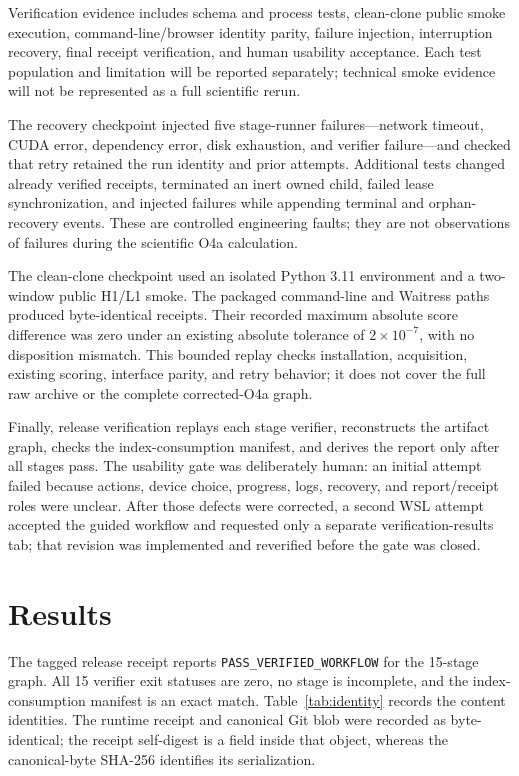 \documentclass[aps,prd,twocolumn,superscriptaddress,nofootinbib,amsmath,amssymb,floatfix,10pt]{revtex4-2}
\begin{document}
Verification evidence includes schema and process tests, clean-clone public
smoke execution, command-line/browser identity parity, failure injection,
interruption recovery, final receipt verification, and human usability
acceptance.  Each test population and limitation will be reported separately;
technical smoke evidence will not be represented as a full scientific rerun.

The recovery checkpoint injected five stage-runner failures---network timeout,
CUDA error, dependency error, disk exhaustion, and verifier failure---and
checked that retry retained the run identity and prior attempts.  Additional
tests changed already verified receipts, terminated an inert owned child,
failed lease synchronization, and injected failures while appending terminal
and orphan-recovery events.  These are controlled engineering faults; they are
not observations of failures during the scientific O4a calculation.

The clean-clone checkpoint used an isolated Python 3.11 environment and a
two-window public H1/L1 smoke.  The packaged command-line and Waitress paths
produced byte-identical receipts.  Their recorded maximum absolute score
difference was zero under an existing absolute tolerance of $2\times10^{-7}$,
with no disposition mismatch.  This bounded replay checks installation,
acquisition, existing scoring, interface parity, and retry behavior; it does
not cover the full raw archive or the complete corrected-O4a graph.

Finally, release verification replays each stage verifier, reconstructs the
artifact graph, checks the index-consumption manifest, and derives the report
only after all stages pass.  The usability gate was deliberately human: an
initial attempt failed because actions, device choice, progress, logs, recovery,
and report/receipt roles were unclear.  After those defects were corrected, a
second WSL attempt accepted the guided workflow and requested only a separate
verification-results tab; that revision was implemented and reverified before
the gate was closed.

\section{Results}
\label{sec:results}

The tagged release receipt reports \texttt{PASS\_VERIFIED\_WORKFLOW} for the
15-stage graph.  All 15 verifier exit statuses are zero, no stage is incomplete,
and the index-consumption manifest is an exact match.  Table~\ref{tab:identity}
records the content identities.  The runtime receipt and canonical Git blob
were recorded as byte-identical; the receipt self-digest is a field inside that
object, whereas the canonical-byte SHA-256 identifies its serialization.
\end{document}
